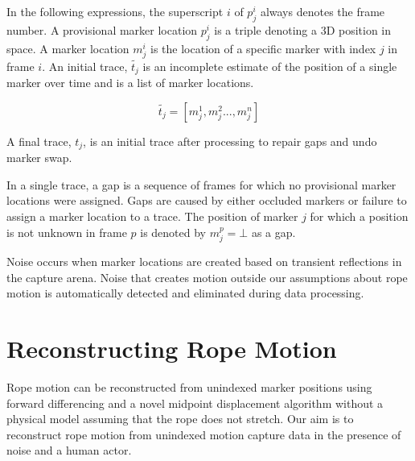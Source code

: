 In the following expressions, the superscript $i$ of $p_j^i$ always denotes the frame number. A provisional marker location $p_j^i$ is a triple denoting a 3D position in space. A marker location $m_j^i$ is the location of a specific marker with index $j$ in frame $i$. An initial trace, $\tilde{t_j}$ is an incomplete estimate of the position of a single marker over time and is a list of marker locations. 

\[
\tilde{t_j}=[m_j^1,m_j^2...,m_j^n]
\]

A final trace, $t_j$, is an initial trace after processing to repair gaps and undo marker swap.

In a single trace, a gap is a sequence of frames for which no provisional marker locations were assigned. Gaps are caused by either occluded markers or failure to assign a marker location to a trace.  The position of marker $j$ for which a position is not unknown in frame $p$ is denoted by $m_j^p=\bot$ as a gap. 

Noise occurs when marker locations are created based on transient reflections in the capture arena. Noise that creates motion outside our assumptions about rope motion is automatically detected and eliminated during data processing.

\section{Reconstructing Rope Motion} 

Rope motion can be reconstructed from unindexed marker positions using forward differencing and a novel midpoint displacement algorithm without a physical model assuming that the rope does not stretch. Our aim is to reconstruct rope motion from unindexed motion capture data in the presence of noise and a human actor. 

